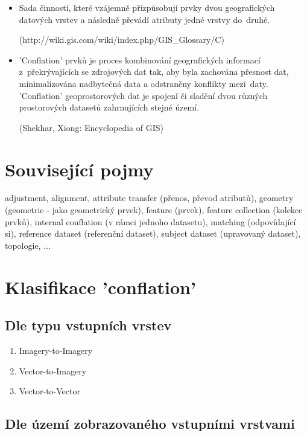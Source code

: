 \begin{itemize}
  \item Sada činností, které vzájemně přizpůsobují prvky dvou geografických datových vrstev a následně převádí atributy jedné vrstvy do~druhé. %
    
    (http://wiki.gis.com/wiki/index.php/GIS\_Glossary/C)
  
  \item 'Conflation' prvků je proces kombinování geografických informací z~překrývajících se zdrojových dat tak, aby byla zachována přesnost dat, minimalizována nadbytečná data
    a odstraněny konflikty mezi~daty. %
    'Conflation' geoprostorových dat je spojení či sladění dvou různých prostorových datasetů zahrnujících stejné území.
    
    (Shekhar, Xiong: Encyclopedia of GIS)
\end{itemize}


\section{Související pojmy}

adjustment, alignment, attribute transfer (přenos, převod atributů), geometry (geometrie - jako geometrický prvek), feature (prvek), feature collection (kolekce prvků),
internal conflation (v rámci jednoho datasetu), matching (odpovídající si), reference dataset (referenční dataset), subject dataset (upravovaný dataset), topologie, ... 

\section{Klasifikace 'conflation'}

\subsection{Dle typu vstupních vrstev}

\begin{enumerate}
  \item Imagery-to-Imagery
  \item Vector-to-Imagery
  \item Vector-to-Vector
\end{enumerate}


\subsection{Dle území zobrazovaného vstupními vrstvami}

